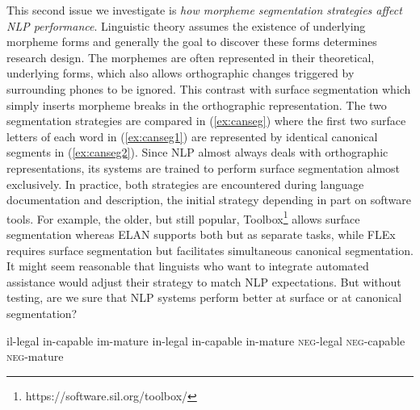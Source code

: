 This second issue we investigate is \textit{how morpheme segmentation strategies affect NLP performance}. Linguistic theory assumes the existence of underlying morpheme forms and generally the goal to discover these forms determines research design. The morphemes are often represented in their theoretical, underlying forms, which also allows orthographic changes triggered by surrounding phones to be ignored. This contrast with surface segmentation which simply inserts morpheme breaks in the orthographic representation. The two segmentation strategies are compared in (\ref{ex:canseg}) where the first two surface letters of each word in (\ref{ex:canseg1}) are represented by identical canonical segments in (\ref{ex:canseg2}). Since NLP almost always deals with orthographic representations, its systems are trained to perform surface segmentation almost exclusively. 
In practice, both strategies are encountered during language documentation and description, the initial strategy depending in part on software tools. For example, the older, but still popular, Toolbox\footnote{https://software.sil.org/toolbox/} allows surface segmentation whereas ELAN \citep{auer_elan_2010} supports both but as separate tasks, while FLEx \citep{baines_overview_2018} requires surface segmentation but facilitates simultaneous canonical segmentation. It might seem reasonable that linguists who want to integrate automated assistance would adjust their strategy to match NLP expectations. But without testing, are we sure that NLP systems perform better at surface or at canonical segmentation?

\pex   
\label{ex:canseg}
\a il-legal \hspace{6mm} in-capable \hspace{5mm} im-mature
\label{ex:canseg1}
\a in-legal \hspace{5mm} in-capable \hspace{5mm} in-mature
\label{ex:canseg2}
\a \textsc{neg}-legal \hspace{1mm} \textsc{neg}-capable \hspace{1mm} \textsc{neg}-mature
\label{ex:canseg3}
\xe


